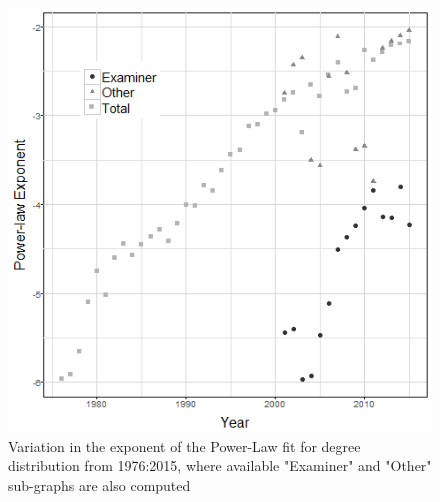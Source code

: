 \begin{figure}
\centering
  \includegraphics[width=0.7\linewidth]{Figures/paramsOverTime_pl}
  \caption[Variation of Power-Law exponent over time]{Variation in the exponent of the Power-Law fit for degree distribution from 1976:2015, where available "Examiner" and "Other" sub-graphs are also computed}
\label{fig:paramsOverTime_pl}
\end{figure}

